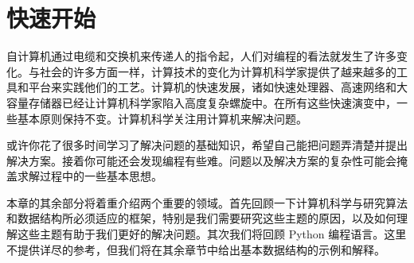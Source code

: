 \section{快速开始}



自计算机通过电缆和交换机来传递人的指令起，人们对编程的看法就发生了许多变化。与社会的许多方面一样，计算技术的变化为计算机科学家提供了越来越多的工具和平台来实践他们的工艺。计算机的快速发展，诸如快速处理器、高速网络和大容量存储器已经让计算机科学家陷入高度复杂螺旋中。在所有这些快速演变中，一些基本原则保持不变。计算机科学关注用计算机来解决问题。


或许你花了很多时间学习了解决问题的基础知识，希望自己能把问题弄清楚并提出解决方案。接着你可能还会发现编程有些难。问题以及解决方案的复杂性可能会掩盖求解过程中的一些基本思想。



本章的其余部分将着重介绍两个重要的领域。首先回顾一下计算机科学与研究算法和数据结构所必须适应的框架，特别是我们需要研究这些主题的原因，以及如何理解这些主题有助于我们更好的解决问题。其次我们将回顾 Python 编程语言。这里不提供详尽的参考，但我们将在其余章节中给出基本数据结构的示例和解释。 
